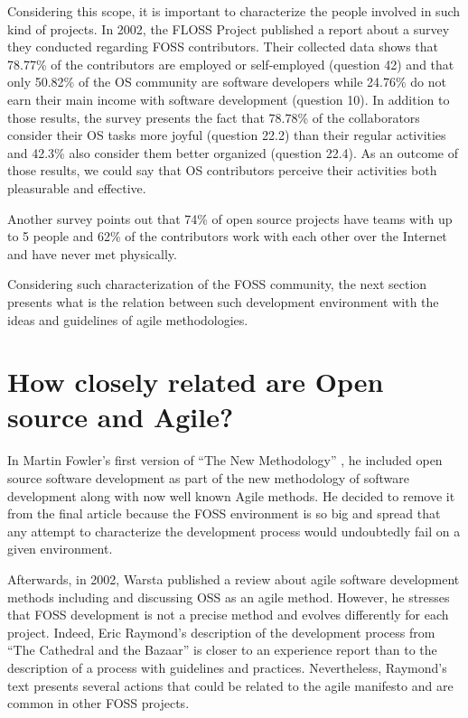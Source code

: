 \documentclass[lnbip]{svmultln}
\begin{document}
Considering this scope, it is important to characterize the people
involved in such kind of projects. In 2002, the FLOSS Project
\cite{url:flossproject} published a report about a survey they
conducted regarding FOSS contributors. Their collected data
\cite{url:flossdata} shows that 78.77\% of the contributors are
employed or self-employed (question 42) and that only 50.82\% of the
OS community are software developers while 24.76\% do not earn their
main income with software development (question 10).  In addition to
those results, the survey presents the fact that 78.78\% of the
collaborators consider their OS tasks more joyful (question 22.2) than
their regular activities and 42.3\% also consider them better
organized (question 22.4). As an outcome of those results, we could
say that OS contributors perceive their activities both pleasurable
and effective.


Another survey \cite{reis2003} points out that 74\% of open source
projects have teams with up to 5 people and 62\% of the contributors
work with each other over the Internet and have never met physically.

Considering such characterization of the FOSS community, the next
section presents what is the relation between such development
environment with the ideas and guidelines of agile methodologies.

\section{How closely related are Open source and Agile?}
\label{sec:relation}

In Martin Fowler's first version of ``The New Methodology''
\cite{url:fowler2000orig}, he included open source software
development as part of the new methodology of software development
along with now well known Agile methods. He decided to remove it from
the final article because the FOSS environment is so big and spread
that any attempt to characterize the development process would
undoubtedly fail on a given environment.

Afterwards, in 2002, Warsta \cite{warsta2002} published a review about
agile software development methods including and discussing OSS as an
agile method.  However, he stresses that FOSS development is not a
precise method and evolves differently for each project. Indeed, Eric
Raymond's description of the development process from ``The Cathedral
and the Bazaar'' \cite{raymond1999} is closer to an experience report
than to the description of a process with guidelines and
practices. Nevertheless, Raymond's text presents several actions that
could be related to the agile manifesto \cite{url:agilemanifesto} and
are common in other FOSS projects.
\end{document}

